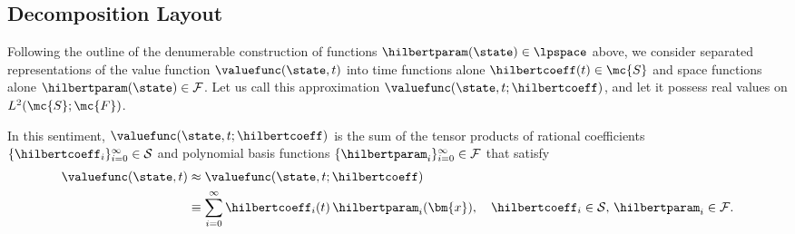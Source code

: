 \subsection{Decomposition Layout}
%
\noindent %
 Following the outline of the denumerable construction of functions $\hilbertparam(\state) \in \lpspace$ above, we consider separated representations of the value function $\valuefunc (\state,t)$  into time functions alone \ie $\hilbertcoeff(t) \in \mc{S}$ and space functions alone \ie $\hilbertparam(\state) \in \mathcal{F}$. Let us call this approximation  $\valuefunc (\state,t; \hilbertcoeff)$, and let it possess real values on  $L^2(\mc{S}; \mc{F})$. %

In this sentiment, $\valuefunc (\state,t; \hilbertcoeff)$ is the sum of the tensor products of rational coefficients $\{\hilbertcoeff_i\}_{i=0}^\infty \in \mathcal{S}$ and polynomial basis functions $\{\hilbertparam_i\}_{i=0}^\infty \in \mathcal{F}$ that satisfy
%
\begin{subequations}
	\begin{align}
		\valuefunc(\state, t) &\approx \valuefunc(\state, t; \hilbertcoeff) \\
		&\equiv \sum_{i=0}^\infty  \hilbertcoeff_i(t) \, \hilbertparam_i(\bm{x}), \quad \hilbertcoeff_i \in  \mathcal{S}, \, \hilbertparam_i \in \mathcal{F}.
	\end{align} 
	\label{eq:decomp_general}
\end{subequations}
%

